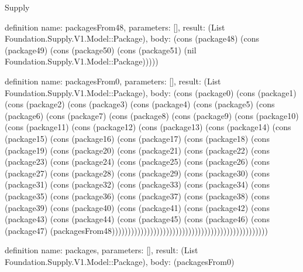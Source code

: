 \begin{lexlean}{Supply}
\begin{semanticmodule}
definition{
  name: packagesFrom48,
  parameters: [],
  result: (List Foundation.Supply.V1.Model::Package),
  body: (cons (package48) (cons (package49) (cons (package50) (cons (package51) (nil Foundation.Supply.V1.Model::Package)))))
}

definition{
  name: packagesFrom0,
  parameters: [],
  result: (List Foundation.Supply.V1.Model::Package),
  body: (cons (package0) (cons (package1) (cons (package2) (cons (package3) (cons (package4) (cons (package5) (cons (package6) (cons (package7) (cons (package8) (cons (package9) (cons (package10) (cons (package11) (cons (package12) (cons (package13) (cons (package14) (cons (package15) (cons (package16) (cons (package17) (cons (package18) (cons (package19) (cons (package20) (cons (package21) (cons (package22) (cons (package23) (cons (package24) (cons (package25) (cons (package26) (cons (package27) (cons (package28) (cons (package29) (cons (package30) (cons (package31) (cons (package32) (cons (package33) (cons (package34) (cons (package35) (cons (package36) (cons (package37) (cons (package38) (cons (package39) (cons (package40) (cons (package41) (cons (package42) (cons (package43) (cons (package44) (cons (package45) (cons (package46) (cons (package47) (packagesFrom48)))))))))))))))))))))))))))))))))))))))))))))))))
}

definition{
  name: packages,
  parameters: [],
  result: (List Foundation.Supply.V1.Model::Package),
  body: (packagesFrom0)
}


\end{semanticmodule}
\end{lexlean}
